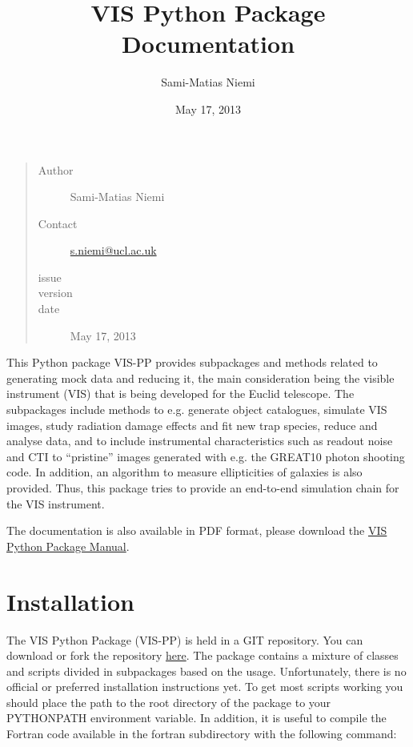 \documentclass[a4paper,11pt,english]{sphinxmanual}
\title{VIS Python Package Documentation}
\date{May 17, 2013}
\author{Sami-Matias Niemi}
\begin{document}
\maketitle
\tableofcontents
{}\label{index::doc}

\begin{quote}\begin{description}
\item[{Author}] \leavevmode
Sami-Matias Niemi

\item[{Contact}] \leavevmode
\href{mailto:s.niemi@ucl.ac.uk}{s.niemi@ucl.ac.uk}

\item[{issue}] 

\item[{version}] 

\item[{date}] \leavevmode
May 17, 2013

\end{description}\end{quote}

This Python package VIS-PP provides subpackages and methods related to generating mock data and reducing it, the main
consideration being the visible instrument (VIS) that is being developed for the Euclid telescope.
The subpackages include methods to e.g. generate object catalogues, simulate VIS images,
study radiation damage effects and fit new trap species, reduce and analyse data, and to include instrumental
characteristics such as readout noise and CTI to ``pristine'' images generated with e.g. the GREAT10 photon
shooting code. In addition, an algorithm to measure ellipticities of galaxies is also provided. Thus,
this package tries to provide an end-to-end simulation chain for the VIS instrument.

The documentation is also available in PDF format, please download the \href{https://www.mssl.ucl.ac.uk/~smn2/Manual.pdf}{VIS Python Package Manual}.


\chapter{Installation}
\label{index:welcome-to-euclid-visible-instrument-vis-python-package-vis-pp-documentation}\label{index:installation}
The VIS Python Package (VIS-PP) is held in a GIT repository. You can download or fork the repository
\href{https://bitbucket.org/niemi/vissim-python/overview}{here}. The package contains a mixture of classes
and scripts divided in subpackages based on the usage. Unfortunately, there is no official or preferred
installation instructions yet. To get most scripts working you should place
the path to the root directory of the package to your PYTHONPATH environment variable. In addition, it is
useful to compile the Fortran code available in the fortran subdirectory with the following command:
\end{document}
